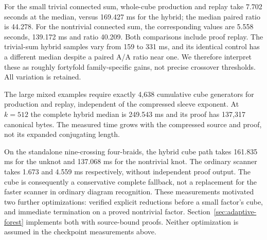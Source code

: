 For the small trivial connected sum, whole-cube production and replay take
7.702 seconds at the median, versus 169.427 ms for the hybrid; the median
paired ratio is 44.278. For the nontrivial connected sum, the corresponding
values are 5.558 seconds, 139.172 ms and ratio 40.209. Both comparisons
include proof replay. The trivial-sum hybrid samples vary from 159 to 331 ms,
and its identical control has a different median despite a paired A/A ratio
near one. We therefore interpret these as roughly fortyfold family-specific
gains, not precise crossover thresholds. All variation is retained.

The large mixed examples require exactly 4,638 cumulative cube generators
for production and replay, independent of the compressed sleeve exponent.
At $k=512$ the complete hybrid median is 249.543 ms and its proof has
137,317 canonical bytes. The measured time grows with the compressed
source and proof, not its expanded conjugating length.

On the standalone nine-crossing four-braids, the hybrid cube path takes
161.835 ms for the unknot and 137.068 ms for the nontrivial knot. The ordinary
scanner takes 1.673 and 4.559 ms respectively, without independent proof
output. The cube is consequently a conservative complete fallback, not a
replacement for the faster scanner in ordinary diagram recognition.
These measurements motivated two further optimizations: verified explicit
reductions before a small factor's cube, and immediate termination on a proved
nontrivial factor. Section~\ref{sec:adaptive-forest} implements both with
source-bound proofs. Neither optimization is assumed in the checkpoint
measurements above.
